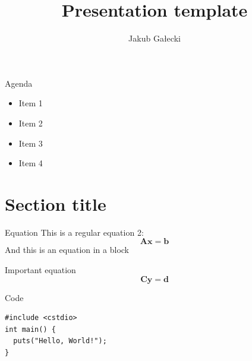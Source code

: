 \documentclass{beamer}
\author{Jakub Gałecki}
\title{Presentation template}
\institute{Division of Aerodynamics}
\date{\vspace{5pt}\formatdate{22}{2}{2022}}
\begin{document}
\maketitle


\begin{frame}{Agenda}
\begin{itemize}
\item Item 1
\item Item 2
\item Item 3
\item Item 4
\end{itemize}
\end{frame}

\section{Section title}
\begin{frame}{Equation}
This is a regular equation 2:
\begin{equation}
\mathbf{A}\mathbf{x} = \textbf{b}
\end{equation}
And this is an equation in a block
\begin{block}{Important equation}
\begin{equation}
\mathbf{C}\mathbf{y} = \textbf{d}
\end{equation}
\end{block}
\end{frame}

\begin{frame}[fragile]{Code}
\begin{verbatim}
#include <cstdio>
int main() {
  puts("Hello, World!");
}
\end{verbatim}
\end{frame}
\end{document}
